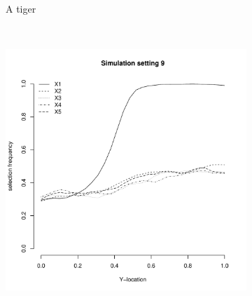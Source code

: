 \documentclass[authoryear, review, 11pt]{elsarticle}
\begin{document}
\begin{figure}
\begin{subfigure}[b]{0.3\textwidth}
			\caption{A tiger}
			\label{fig:tiger}
		\end{subfigure}
        ~ %
		\begin{subfigure}[b]{0.3\textwidth}
			\centering
			\includegraphics[width=\textwidth]{../../figures/simulation/28-9-profile-selection.pdf}
			\label{fig:mouse}
		\end{subfigure}
	\end{figure}
\end{document}
